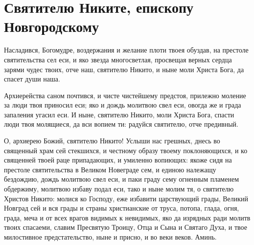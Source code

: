 \section{Святителю Никите, епископу Новгородскому}\begin{mymulticols}


Насладився, Богомудре, воздержания и желание плоти твоея обуздав, на престоле святительства сел еси, и яко звезда многосветлая, просвещая верных сердца зарями чудес твоих, отче наш, святителю Никито, и ныне моли Христа Бога, да спасет души наша.


Архиерейства саном почтився, и чисте чистейшему предстоя, прилежно моление за люди твоя приносил еси; яко и дождь молитвою свел еси, овогда же и града запаления угасил еси. И ныне, святителю Никито, моли Христа Бога, спасти люди твоя молящиеся, да вси вопием ти: радуйся святителю, отче предивный.


О, архиерею Божий, святителю Никито! Услыши нас грешных, днесь во священный храм сей стекшихся, и честному образу твоему поклоняющихся, и ко священней твоей раце припадающих, и умиленно вопиющих: якоже сидя на престоле святительства в Великом Новеграде сем, и единою належащу бездождию, дождь молитвою свел еси, и паки граду сему огненным пламенем обдержиму, молитвою избаву подал еси, тако и ныне молим тя, о святителю Христов Никито: молися ко Господу, еже избавити царствующий грады, Великий Новград сей и вся грады и страны христианские от труса, потопа, глада, огня, града, меча и от всех врагов видимых к невидимых, яко да изрядных ради молитв твоих спасаеми, славим Пресвятую Троицу, Отца и Сына и Святаго Духа, и твое милостивное предстательство, ныне и присно, и во веки веков. Аминь.

\end{mymulticols}

